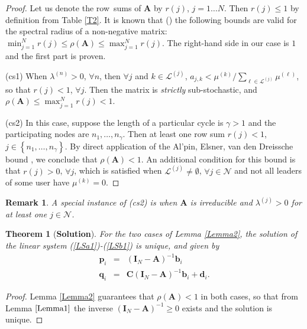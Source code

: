 \documentclass[10pt, conference, letterpaper]{IEEEtran}
\newtheorem{theo}{Theorem}
\newtheorem{rem}{Remark}
\begin{document}
{\begin{proof}
Let us denote the row~sums of $\mathbf{A}$ by $r(j)$, $j=1\ldots N$. Then $r(j)\leq 1$ by definition from Table \ref{T2}. It is known that (\cite[Theorem 8.1.22]{HornJohn}) the following bounds are valid for the spectral radius of a non-negative matrix: $\min_{j=1}^N r(j) \leq \rho(\mathbf{A}) \leq \max_{j=1}^N r(j)$. The right-hand side in our case is $1$ and the first part is proven. 

(cs1) When $\lambda^{(n)}>0$, $\forall n$, then $\forall j$ and $k\in\mathcal{L}^{(j)}$, $a_{j,k}< \mu^{(k)} / \sum_{\ell\in\mathcal{L}^{(j)}}\mu^{(\ell)}$, so that $r(j)<1$, $\forall j$. Then the matrix is \textit{strictly} sub-stochastic, and $\rho(\mathbf{A})\leq \max_{j=1}^N r(j)<1$.

(cs2) In this case, suppose the length of a particular cycle is $\gamma>1$ and the participating nodes are $n_1,\ldots,n_{\gamma}$. Then at least one row sum $r(j)<1$, $j\in\left\{n_1,\ldots,n_{\gamma}\right\}$. By direct application of the Al'pin, Elsner, van den Dreissche bound \cite[Theorem A]{EvD08}, we conclude that $\rho(\mathbf{A})<1$. An additional condition for this bound is that $r(j)>0$, $\forall j$, which is satisfied when $\mathcal{L}^{(j)}\neq \emptyset$, $\forall j\in\mathcal{N}$ and not all leaders of some user have $\mu^{(k)}=0$.
\end{proof}

\begin{rem}
A special instance of (cs2) is when $\mathbf{A}$ is irreducible and $\lambda^{(j)}>0$ for at least one $j\in\mathcal{N}$.
\end{rem}

\begin{theo}[\textbf{Solution}]
\label{Main}
For the two cases of Lemma \ref{Lemma2}, the solution of the linear system (\ref{LSa1})-(\ref{LSb1}) is unique, and given by
\begin{eqnarray}
\label{Th1a}
\mathbf{p}_i & = & \left(\mathbf{I}_N-\mathbf{A}\right)^{-1}\mathbf{b}_i\\
\label{Th1b}
\mathbf{q}_i & = & \mathbf{C} \left(\mathbf{I}_N-\mathbf{A}\right)^{-1}\mathbf{b}_i + \mathbf{d}_i.
\end{eqnarray}

\end{theo}
\begin{proof}
Lemma \ref{Lemma2} guarantees that $\rho(\mathbf{A})<1$ in both cases, so that from Lemma $\ref{Lemma1}$ the inverse $\left(\mathbf{I}_N-\mathbf{A}\right)^{-1}\geq 0$ exists and the solution is unique.
\end{proof}

}
\end{document}
